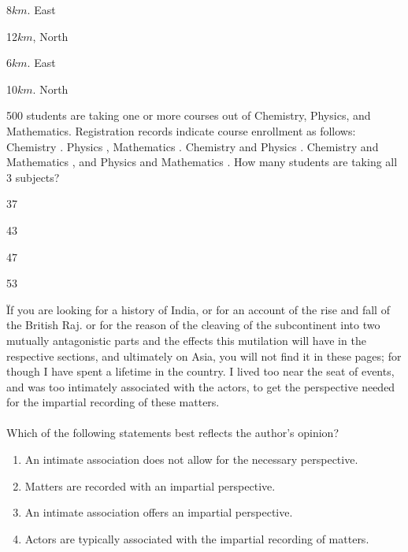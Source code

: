 \begin{enumerate}
\begin{multicols}{4}
\item 8$km$. East
\item 12$km$, North
\item 6$km$. East
\item 10$km$. North
\end{multicols}
\end{enumerate}
\item 500 students are taking one or more courses out of Chemistry, Physics, and Mathematics. Registration records indicate course enrollment as follows: Chemistry . Physics , Mathematics . Chemistry and Physics . Chemistry and Mathematics , and Physics and Mathematics . How many students are taking all 3 subjects?
\begin{enumerate}
\begin{multicols}{4}
\item 37
\item 43
\item 47
\item 53    
\end{multicols}
\end{enumerate}
\item \"If you are looking for a history of India, or for an account of the rise and fall of the British Raj. or for the reason of the cleaving of the subcontinent into two mutually antagonistic parts and the effects this mutilation will have in the respective sections, and ultimately on Asia, you will not find it in these pages; for though I have spent a lifetime in the country. I lived too near the seat of events, and was too intimately associated with the actors, to get the perspective needed for the impartial recording of these matters.\"\\\\
Which of the following statements best reflects the author's opinion?
\begin{enumerate}
\item An intimate association does not allow for the necessary perspective.
\item Matters are recorded with an impartial perspective.
\item An intimate association offers an impartial perspective.
\item Actors are typically associated with the impartial recording of matters.
\end{enumerate}
